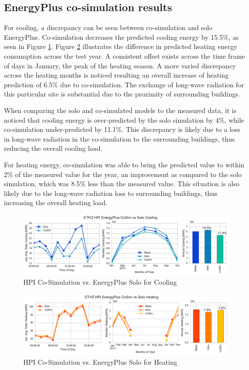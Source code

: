 \documentclass{tBPS2e}
\theoremstyle{plain}
\theoremstyle{definition}
\theoremstyle{remark}
\begin{document}
\subsection{EnergyPlus co-simulation results}
For cooling, a discrepancy can be seen between co-simulation and solo EnergyPlus. 
Co-simulation decreases the predicted cooling energy by 15.5\%, as seen in Figure
\ref{fig:hpi_energypluscooling}. Figure \ref{fig:hpi_energyplusheating}
illustrates the difference in predicted heating energy consumption across the
test year. A consistent offset exists across the time frame of days in
January, the peak of the heating season. A more varied discrepancy across the
heating months is noticed resulting an overall increase of heating prediction
of 6.5\% due to co-simulation. The exchange of long-wave radiation for this
particular site is substantial due to the proximity of surrounding buildings.

When comparing the solo and co-simulated models to the measured data, it is noticed that 
cooling energy is over-predicted by the solo simulation by 4\%, while 
co-simulation under-predicted 
by 11.1\%. This discrepancy is likely due to a loss in long-wave 
radiation in the co-simulation to the surrounding buildings, thus reducing the overall 
cooling load. 

For heating energy, co-simulation was able to bring the predicted value to within 2\% of 
the measured value for the year, an improvement as compared to the solo simulation, 
which was 8.5\% less than the measured value. This situation is also 
likely due to the long-wave radiation loss to surrounding buildings, 
thus increasing the overall heating load.

\begin{figure}[H]
\centering
\includegraphics[scale=0.55]{figures/HPI_EnergyPlus_Cooling}
\caption{HPI Co-Simulation vs. EnergyPlus Solo for Cooling}
\label{fig:hpi_energypluscooling}
\end{figure}

\begin{figure}[H]
\centering
\includegraphics[scale=0.55]{figures/HPI_EnergyPlus_Heating}
\caption{HPI Co-Simulation vs. EnergyPlus Solo for Heating}
\label{fig:hpi_energyplusheating}
\end{figure}
\end{document}
